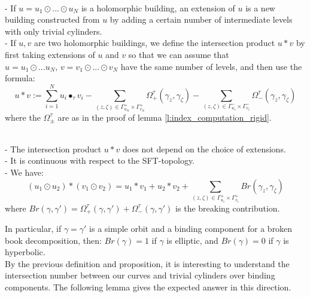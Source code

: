\documentclass[../main.tex]{subfiles}
\begin{document}
\begin{definition}\text{}\\
- If $u = u_1\odot ...\odot u_N$ is a holomorphic building, an extension of $u$ is a new building constructed from $u$ by adding a certain number of intermediate levels with only trivial cylinders.\\
- If $u,v$ are two holomorphic buildings, we define the intersection product $u*v$ by first taking extensions of $u$ and $v$ so that we can assume that $u = u_1\odot...u_N,\,v = v_1\odot ...\odot v_N$ have the same number of levels, and then use the formula: 
$$u*v := \sum_{i = 1}^Nu_i\bullet_\tau v_i - \sum_{(z,\zeta)\in \Gamma^+_{u_N}\times \Gamma^+_{v_N}}\Omega_+^\tau(\gamma_z,\gamma_\zeta) - \sum_{(z,\zeta)\in \Gamma^-_{u_1}\times \Gamma^-_{v_1}}\Omega_-^\tau(\gamma_z,\gamma_\zeta)$$
where the $\Omega_\pm^\tau$ are as in the proof of lemma \ref{l:index_computation_rigid}.
\end{definition}

\begin{proposition}\label{p:building_intersection}\text{}\\
- The intersection product $u*v$ does not depend on the choice of extensions.\\
- It is continuous with respect to the SFT-topology.\\
- We have: $$(u_1\odot u_2)*(v_1\odot v_2) = u_1*v_1 + u_2*v_2 + \displaystyle\sum_{(z,\zeta)\in\Gamma^+_{u_1}\times \Gamma^+_{v_1}} Br(\gamma_z,\gamma_\zeta)$$ where $Br(\gamma,\gamma') = \Omega^\tau_+(\gamma,\gamma') + \Omega_-^\tau(\gamma,\gamma')$ is the breaking contribution. 
\end{proposition}

In particular, if $\gamma = \gamma'$ is a simple orbit and a binding component for a broken book decomposition, then: $Br(\gamma) = 1$ if $\gamma$ is elliptic, and $Br(\gamma) = 0$ if $\gamma$ is hyperbolic.\\
By the previous definition and proposition, it is interesting to understand the intersection number between our curves and trivial cylinders over binding components. The following lemma gives the expected answer in this direction.
\end{document}
